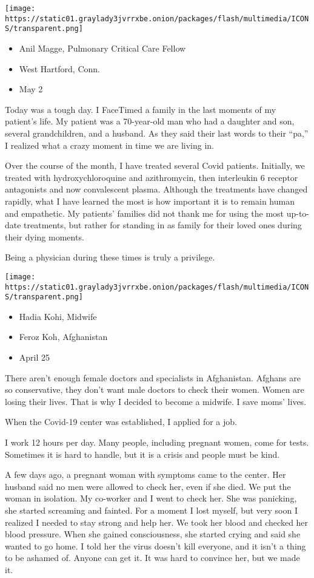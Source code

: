 \texttt{[image: https://static01.graylady3jvrrxbe.onion/packages/flash/multimedia/ICONS/transparent.png]}

\begin{itemize}
\tightlist
\item
  Anil Magge, Pulmonary Critical Care Fellow
\item
  West Hartford, Conn.
\item
  May 2
\end{itemize}

Today was a tough day. I FaceTimed a family in the last moments of my
patient's life. My patient was a 70-year-old man who had a daughter and
son, several grandchildren, and a husband. As they said their last words
to their ``pa,'' I realized what a crazy moment in time we are living
in.

Over the course of the month, I have treated several Covid patients.
Initially, we treated with hydroxychloroquine and azithromycin, then
interleukin 6 receptor antagonists and now convalescent plasma. Although
the treatments have changed rapidly, what I have learned the most is how
important it is to remain human and empathetic. My patients' families
did not thank me for using the most up-to-date treatments, but rather
for standing in as family for their loved ones during their dying
moments.

Being a physician during these times is truly a privilege.

\texttt{[image: https://static01.graylady3jvrrxbe.onion/packages/flash/multimedia/ICONS/transparent.png]}

\begin{itemize}
\tightlist
\item
  Hadia Kohi, Midwife
\item
  Feroz Koh, Afghanistan
\item
  April 25
\end{itemize}

There aren't enough female doctors and specialists in Afghanistan.
Afghans are so conservative, they don't want male doctors to check their
women. Women are losing their lives. That is why I decided to become a
midwife. I save moms' lives.

When the Covid-19 center was established, I applied for a job.

I work 12 hours per day. Many people, including pregnant women, come for
tests. Sometimes it is hard to handle, but it is a crisis and people
must be kind.

A few days ago, a pregnant woman with symptoms came to the center. Her
husband said no men were allowed to check her, even if she died. We put
the woman in isolation. My co-worker and I went to check her. She was
panicking, she started screaming and fainted. For a moment I lost
myself, but very soon I realized I needed to stay strong and help her.
We took her blood and checked her blood pressure. When she gained
consciousness, she started crying and said she wanted to go home. I told
her the virus doesn't kill everyone, and it isn't a thing to be ashamed
of. Anyone can get it. It was hard to convince her, but we made it.

